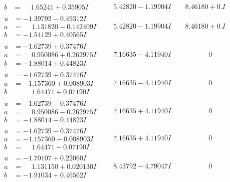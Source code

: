 \documentclass[1p]{elsarticle_modified}
\theoremstyle{definition}
\begin{document}
$$\begin{array}{c|c|c}
\begin{aligned}
b &= \phantom{-}1.65241 + 0.35905 I\end{aligned}
 & \phantom{-}5.42820 - 1.19904 I & \phantom{-}8.46180 + 0. I\phantom{ +0.000000I} \\ \hline\begin{aligned}
u &= -1.39792 - 0.49312 I \\
a &= \phantom{-}1.131820 - 0.142409 I \\
b &= -1.54129 + 0.40565 I\end{aligned}
 & \phantom{-}5.42820 - 1.19904 I & \phantom{-}8.46180 + 0. I\phantom{ +0.000000I} \\ \hline\begin{aligned}
u &= -1.62739 + 0.37476 I \\
a &= \phantom{-}0.950086 + 0.262975 I \\
b &= -1.88014 + 0.44823 I\end{aligned}
 & \phantom{-}7.16635 - 4.11940 I & \phantom{-0.000000 } 0 \\ \hline\begin{aligned}
u &= -1.62739 + 0.37476 I \\
a &= -1.157360 + 0.008903 I \\
b &= \phantom{-}1.64471 + 0.07190 I\end{aligned}
 & \phantom{-}7.16635 - 4.11940 I & \phantom{-0.000000 } 0 \\ \hline\begin{aligned}
u &= -1.62739 - 0.37476 I \\
a &= \phantom{-}0.950086 - 0.262975 I \\
b &= -1.88014 - 0.44823 I\end{aligned}
 & \phantom{-}7.16635 + 4.11940 I & \phantom{-0.000000 } 0 \\ \hline\begin{aligned}
u &= -1.62739 - 0.37476 I \\
a &= -1.157360 - 0.008903 I \\
b &= \phantom{-}1.64471 - 0.07190 I\end{aligned}
 & \phantom{-}7.16635 + 4.11940 I & \phantom{-0.000000 } 0 \\ \hline\begin{aligned}
u &= -1.70107 + 0.22060 I \\
a &= \phantom{-}1.131150 + 0.020130 I \\
b &= -1.91034 + 0.46562 I\end{aligned}
 & \phantom{-}8.43792 - 4.79047 I & \phantom{-0.000000 } 0 \\ \hline\begin{aligned}

\end{aligned}
\end{array}$$
\end{document}
